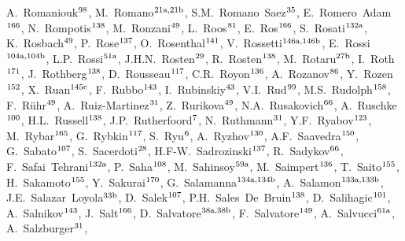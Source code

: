 \begin{flushleft}
A.~Romaniouk$^\textrm{\scriptsize 98}$,
M.~Romano$^\textrm{\scriptsize 21a,21b}$,
S.M.~Romano~Saez$^\textrm{\scriptsize 35}$,
E.~Romero~Adam$^\textrm{\scriptsize 166}$,
N.~Rompotis$^\textrm{\scriptsize 138}$,
M.~Ronzani$^\textrm{\scriptsize 49}$,
L.~Roos$^\textrm{\scriptsize 81}$,
E.~Ros$^\textrm{\scriptsize 166}$,
S.~Rosati$^\textrm{\scriptsize 132a}$,
K.~Rosbach$^\textrm{\scriptsize 49}$,
P.~Rose$^\textrm{\scriptsize 137}$,
O.~Rosenthal$^\textrm{\scriptsize 141}$,
V.~Rossetti$^\textrm{\scriptsize 146a,146b}$,
E.~Rossi$^\textrm{\scriptsize 104a,104b}$,
L.P.~Rossi$^\textrm{\scriptsize 51a}$,
J.H.N.~Rosten$^\textrm{\scriptsize 29}$,
R.~Rosten$^\textrm{\scriptsize 138}$,
M.~Rotaru$^\textrm{\scriptsize 27b}$,
I.~Roth$^\textrm{\scriptsize 171}$,
J.~Rothberg$^\textrm{\scriptsize 138}$,
D.~Rousseau$^\textrm{\scriptsize 117}$,
C.R.~Royon$^\textrm{\scriptsize 136}$,
A.~Rozanov$^\textrm{\scriptsize 86}$,
Y.~Rozen$^\textrm{\scriptsize 152}$,
X.~Ruan$^\textrm{\scriptsize 145c}$,
F.~Rubbo$^\textrm{\scriptsize 143}$,
I.~Rubinskiy$^\textrm{\scriptsize 43}$,
V.I.~Rud$^\textrm{\scriptsize 99}$,
M.S.~Rudolph$^\textrm{\scriptsize 158}$,
F.~R\"uhr$^\textrm{\scriptsize 49}$,
A.~Ruiz-Martinez$^\textrm{\scriptsize 31}$,
Z.~Rurikova$^\textrm{\scriptsize 49}$,
N.A.~Rusakovich$^\textrm{\scriptsize 66}$,
A.~Ruschke$^\textrm{\scriptsize 100}$,
H.L.~Russell$^\textrm{\scriptsize 138}$,
J.P.~Rutherfoord$^\textrm{\scriptsize 7}$,
N.~Ruthmann$^\textrm{\scriptsize 31}$,
Y.F.~Ryabov$^\textrm{\scriptsize 123}$,
M.~Rybar$^\textrm{\scriptsize 165}$,
G.~Rybkin$^\textrm{\scriptsize 117}$,
S.~Ryu$^\textrm{\scriptsize 6}$,
A.~Ryzhov$^\textrm{\scriptsize 130}$,
A.F.~Saavedra$^\textrm{\scriptsize 150}$,
G.~Sabato$^\textrm{\scriptsize 107}$,
S.~Sacerdoti$^\textrm{\scriptsize 28}$,
H.F-W.~Sadrozinski$^\textrm{\scriptsize 137}$,
R.~Sadykov$^\textrm{\scriptsize 66}$,
F.~Safai~Tehrani$^\textrm{\scriptsize 132a}$,
P.~Saha$^\textrm{\scriptsize 108}$,
M.~Sahinsoy$^\textrm{\scriptsize 59a}$,
M.~Saimpert$^\textrm{\scriptsize 136}$,
T.~Saito$^\textrm{\scriptsize 155}$,
H.~Sakamoto$^\textrm{\scriptsize 155}$,
Y.~Sakurai$^\textrm{\scriptsize 170}$,
G.~Salamanna$^\textrm{\scriptsize 134a,134b}$,
A.~Salamon$^\textrm{\scriptsize 133a,133b}$,
J.E.~Salazar~Loyola$^\textrm{\scriptsize 33b}$,
D.~Salek$^\textrm{\scriptsize 107}$,
P.H.~Sales~De~Bruin$^\textrm{\scriptsize 138}$,
D.~Salihagic$^\textrm{\scriptsize 101}$,
A.~Salnikov$^\textrm{\scriptsize 143}$,
J.~Salt$^\textrm{\scriptsize 166}$,
D.~Salvatore$^\textrm{\scriptsize 38a,38b}$,
F.~Salvatore$^\textrm{\scriptsize 149}$,
A.~Salvucci$^\textrm{\scriptsize 61a}$,
A.~Salzburger$^\textrm{\scriptsize 31}$,

\end{flushleft}
